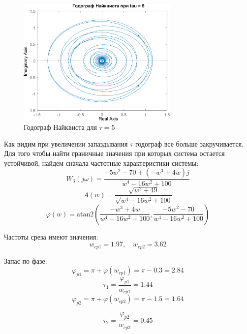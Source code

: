\begin{figure}[H]
    \centering
    \centering
    \includegraphics[width=0.7\textwidth, trim={0cm 0cm 0cm 0cm}]{../images/3_1_4_hod.png}
    \caption{Годограф Найквиста для $\tau = 5$}
\end{figure}

Как видим при увеличении запаздывания $\tau$ годограф все больше закручивается. Для 
того чтобы найти граничные значения при которых система остается устойчивой, найдем
сначала частотные характеристики системы:
\[
W_3(j\omega) = \frac{-5w^2 - 70 + (-w^3 + 4w)j}{w^4 - 16w^2 + 100}
\]
\[
A(w) = \frac{\sqrt{w^2 + 49}}{\sqrt{w^4 - 16w^2 + 100}}
\]
\[
\varphi(w) = \text{atan2}\left(\frac{-w^3 + 4w}{w^4 - 16w^2 + 100}, \frac{-5w^2 - 70}{w^4 - 16w^2 + 100}\right)
\]

Частоты среза имеют значения:
\[
w_{cp1} = 1.97, \quad w_{cp2} = 3.62
\]

Запас по фазе:
\[
\varphi_{p1} = \pi + \varphi(w_{cp1}) = \pi - 0.3 = 2.84
\]
\[
\tau_1 = \frac{\varphi_{p1}}{w_{cp1}} = 1.44
\]
\[
\varphi_{p2} = \pi + \varphi(w_{cp2}) = \pi - 1.5 = 1.64
\]

\[
\tau_2 = \frac{\varphi_{p2}}{w_{cp2}} = 0.45
\]

